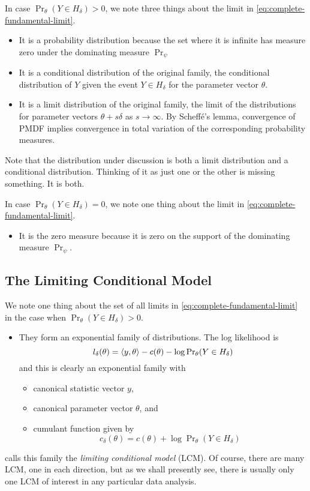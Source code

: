 In case $\Pr_\theta(Y \in H_\delta) > 0$,
we note three things about the limit in \eqref{eq:complete-fundamental-limit}.
\begin{itemize}
\item It is a probability distribution because the set where it is infinite
    has measure zero under the dominating measure $\Pr_\psi$
\item It is a conditional distribution of the original family,
    the conditional distribution of $Y$ given the event $Y \in H_\delta$
    for the parameter vector $\theta$.
\item It is a limit distribution of the original family,
    the limit of the distributions for parameter vectors $\theta + s \delta$
    as $s \to \infty$.  By Scheff\'{e}'s lemma, convergence of PMDF implies
    convergence in total variation of the corresponding probability measures.
\end{itemize}
Note that the distribution under discussion is both a limit distribution
and a conditional distribution.  Thinking of it as just one or the other
is missing something.  It is both.

In case $\Pr_\theta(Y \in H_\delta) = 0$,
we note one thing about the limit in \eqref{eq:complete-fundamental-limit}.
\begin{itemize}
\item It is the zero measure because it is zero on the support of
the dominating measure $\Pr_\psi$.
\end{itemize}

\subsection{The Limiting Conditional Model}

We note one thing about the set of all limits
in \eqref{eq:complete-fundamental-limit}
in the case when $\Pr_\theta(Y \in H_\delta) > 0$.
\begin{itemize}
\item They form an exponential family of distributions.  The log likelihood is
\begin{equation} \label{eq:logl-expfam-lcm}
   l_\delta(\theta) =
   \langle y, \theta \rangle - c(\theta) - \log \Pr\nolimits_\theta(Y \in H_\delta)
\end{equation}
and this is clearly an exponential family with
\begin{itemize}
\item canonical statistic vector $y$,
\item canonical parameter vector $\theta$, and
\item cumulant function given by
\begin{equation} \label{eq:cumfun-lcm}
   c_\delta(\theta) = c(\theta) + \log \Pr\nolimits_\theta(Y \in H_\delta)
\end{equation}
\end{itemize}
\end{itemize}
\citet{geyer-gdor} calls this family the \emph{limiting conditional model}
(LCM).  Of course, there are many LCM, one in each direction, but as we
shall presently see, there is usually only one LCM of interest
in any particular data analysis.

